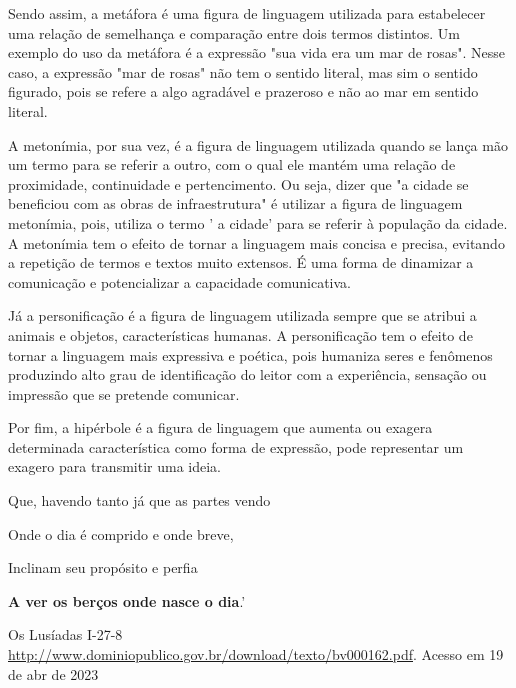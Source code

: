{{Sendo assim, a metáfora é uma figura de linguagem utilizada para
estabelecer uma relação de semelhança e comparação entre dois termos
distintos. Um exemplo do uso da metáfora é a expressão "sua vida era um
mar de rosas". Nesse caso, a expressão "mar de rosas" não tem o sentido
literal, mas sim o sentido figurado, pois se refere a algo agradável e
prazeroso e não ao mar em sentido literal.

A metonímia, por sua vez, é a figura de linguagem utilizada quando se
lança mão um termo para se referir a outro, com o qual ele mantém uma
relação de proximidade, continuidade e pertencimento. Ou seja, dizer que
"a cidade se beneficiou com as obras de infraestrutura" é utilizar a
figura de linguagem metonímia, pois, utiliza o termo ' a cidade' para se
referir à população da cidade. A metonímia tem o efeito de tornar a
linguagem mais concisa e precisa, evitando a repetição de termos e
textos muito extensos. É uma forma de dinamizar a comunicação e
potencializar a capacidade comunicativa.

Já a personificação é a figura de linguagem utilizada sempre que se
atribui a animais e objetos, características humanas. A personificação
tem o efeito de tornar a linguagem mais expressiva e poética, pois
humaniza seres e fenômenos produzindo alto grau de identificação do
leitor com a experiência, sensação ou impressão que se pretende
comunicar.

Por fim, a hipérbole é a figura de linguagem que aumenta ou exagera
determinada característica como forma de expressão, pode representar um
exagero para transmitir uma ideia.



Que, havendo tanto já que as partes vendo

Onde o dia é comprido e onde breve,

Inclinam seu propósito e perfia

\textbf{A ver os berços onde nasce o dia}.'

Os Lusíadas I-27-8
\href{http://www.dominiopublico.gov.br/download/texto/bv000162.pdf}{\uline{http://www.dominiopublico.gov.br/download/texto/bv000162.pdf}}.
Acesso em 19 de abr de 2023

}}
